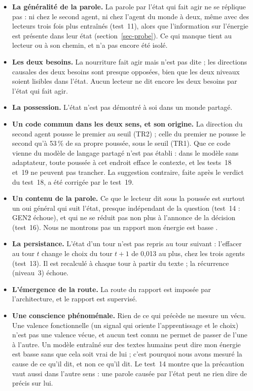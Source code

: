 \documentclass[11pt,a4paper]{article}
\begin{document}
\begin{itemize}
\item \textbf{La généralité de la parole.} La parole par l'état qui fait agir ne se
réplique pas : ni chez le second agent, ni chez l'agent du monde à deux, même avec
des lecteurs trois fois plus entraînés (test~11), alors que l'information sur
l'énergie est présente dans leur état (section~\ref{sec-probe}). Ce qui manque
tient au lecteur ou à son chemin, et n'a pas encore été isolé.
\item \textbf{Les deux besoins.} La nourriture fait agir mais n'est pas dite ; les
directions causales des deux besoins sont presque opposées, bien que les deux niveaux
soient lisibles dans l'état. Aucun lecteur ne dit encore les deux besoins par l'état
qui fait agir.
\item \textbf{La possession.} L'état n'est pas démontré \og à soi \fg{} dans un monde
partagé.
\item \textbf{Un code commun dans les deux sens, et son origine.} La direction du second agent
pousse le premier au seuil (TR2) ; celle du premier ne pousse le second qu'à 53\,\% de sa
propre poussée, sous le seuil (TR1). Que ce code vienne du modèle de langage partagé n'est pas
établi : dans le modèle sans adaptateur, toute poussée à cet endroit efface le contexte, et les
tests~18 et~19 ne peuvent pas trancher. La suggestion contraire, faite après le verdict du
test~18, a été corrigée par le test~19.
\item \textbf{Un contenu de la parole.} Ce que le lecteur dit sous la poussée est
surtout un \og oui \fg{} général qui suit l'état, presque indépendant de la question
(test~14 : GEN2 échoue), et qui ne se réduit pas non plus à l'annonce de la décision
(test~16). Nous ne montrons pas un rapport \og mon énergie est basse \fg{}.
\item \textbf{La persistance.} L'état d'un tour n'est pas repris au tour suivant :
l'effacer au tour $t$ change le choix du tour $t+1$ de 0,013 au plus, chez les trois
agents (test~13). Il est recalculé à chaque tour à partir du texte ; la récurrence
(niveau~3) échoue.
\item \textbf{L'émergence de la route.} La route du rapport est imposée par
l'architecture, et le rapport est supervisé.
\item \textbf{Une conscience phénoménale.} Rien de ce qui précède ne mesure un vécu.
Une valence fonctionnelle (un signal qui oriente l'apprentissage et le choix) n'est
pas une valence vécue, et aucun test connu ne permet de passer de l'une à l'autre.
Un modèle entraîné sur des textes humains peut dire \og mon énergie est basse \fg{}
sans que cela soit vrai de lui ; c'est pourquoi nous avons mesuré la cause de ce
qu'il dit, et non ce qu'il dit. Le test~14 montre que la précaution vaut aussi dans
l'autre sens : une parole causée par l'état peut ne rien dire de précis sur lui.
\end{itemize}
\end{document}
